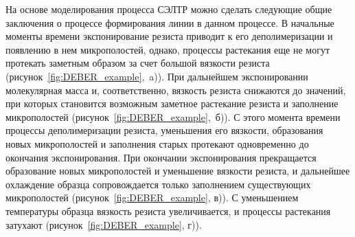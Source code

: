 На основе моделирования процесса СЭЛТР можно сделать следующие общие заключения о процессе формирования линии в данном процессе. В начальные моменты времени экспонирование резиста приводит к его деполимеризации и появлению в нем микрополостей, однако, процессы растекания еще не могут протекать заметным образом за счет большой вязкости резиста (рисунок~\ref{fig:DEBER_example},~a)). При дальнейшем экспонировании молекулярная масса и, соответственно, вязкость резиста снижаются до значений, при которых становится возможным заметное растекание резиста и заполнение микрополостей (рисунок~\ref{fig:DEBER_example},~б)). С этого момента времени процессы деполимеризации резиста, уменьшения его вязкости, образования новых микрополостей и заполнения старых протекают одновременно до окончания экспонирования. При окончании экспонирования прекращается образование новых микрополостей и уменьшение вязкости резиста, и дальнейшее охлаждение образца сопровождается только заполнением существующих микрополостей (рисунок~\ref{fig:DEBER_example}, в)). С уменьшением температуры образца вязкость резиста увеличивается, и процессы растекания затухают (рисунок~\ref{fig:DEBER_example}, г)).

